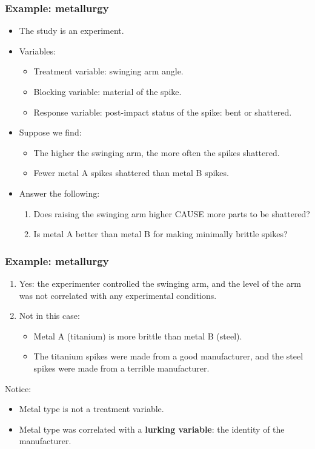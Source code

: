 \documentclass[handout]{beamer}
\numberwithin{equation}{section}
\begin{document}
\begin{frame}
\frametitle{Example: metallurgy}
\begin{itemize}
\item The study is an experiment. 
\pause \item Variables:
\begin{itemize}
\item Treatment variable: swinging arm angle.
\pause \item Blocking variable: material of the spike.
\pause \item Response variable: post-impact status of the spike: bent or shattered.
\end{itemize}

\pause \item Suppose we find:
\begin{itemize}
\item The higher the swinging arm, the more often the spikes shattered.
\pause \item Fewer metal A spikes shattered than metal B spikes.
\end{itemize}
\pause \item Answer the following:
\begin{enumerate}
\item Does raising the swinging arm higher CAUSE more parts to be shattered?
\pause \item Is metal A better than metal B for making minimally brittle spikes?
\end{enumerate}
\end{itemize}
\end{frame}

\begin{frame}
\frametitle{Example: metallurgy}
\begin{enumerate}[1. ]
\item Yes: the experimenter controlled the swinging arm, and the level of the arm was not correlated with any experimental conditions.
\item Not in this case: 
\begin{itemize}
\item Metal A (titanium) is more brittle than metal B (steel).
\item The titanium spikes were made from a good manufacturer, and the steel spikes were made from a terrible manufacturer. 
\end{itemize}
\end{enumerate}

Notice: 
\begin{itemize}
\item Metal type is not a treatment variable.
\item Metal type was correlated with a {\bf lurking variable}: the identity of the manufacturer.
\end{itemize}
\end{frame}
\end{document}
